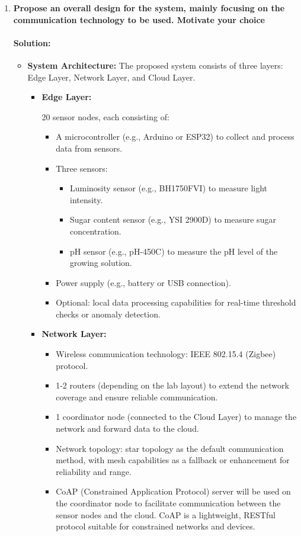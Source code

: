 \documentclass{article}
\begin{document}
\begin{enumerate}
    \item \textbf{Propose an overall design for the system, mainly focusing on the communication technology to be used. Motivate your choice}

    \paragraph{Solution:} 
    
\begin{itemize}
    \item \textbf{System Architecture:} The proposed system consists of three layers: Edge Layer, Network Layer, and Cloud Layer.

\begin{itemize}
    \item \textbf{Edge Layer:} 
    
    20 sensor nodes, each consisting of:
\begin{itemize}
    \item A microcontroller (e.g., Arduino or ESP32) to collect and process data from sensors.
    \item Three sensors:
    \begin{itemize}
        \item Luminosity sensor (e.g., BH1750FVI) to measure light intensity.
        \item Sugar content sensor (e.g., YSI 2900D) to measure sugar concentration.
        \item pH sensor (e.g., pH-450C) to measure the pH level of the growing solution.
    \end{itemize}
    \item Power supply (e.g., battery or USB connection).
    \item Optional: local data processing capabilities for real-time threshold checks or anomaly detection.
\end{itemize}

    \item \textbf{Network Layer:}

\begin{itemize}
    \item Wireless communication technology: IEEE 802.15.4 (Zigbee) protocol.
    \item 1-2 routers (depending on the lab layout) to extend the network coverage and ensure reliable communication.
    \item 1 coordinator node (connected to the Cloud Layer) to manage the network and forward data to the cloud.
    \item Network topology: star topology as the default communication method, with mesh capabilities as a fallback or enhancement for reliability and range.
    \item CoAP (Constrained Application Protocol) server will be used on the coordinator node to facilitate communication between the sensor nodes and the cloud. CoAP is a lightweight, RESTful protocol suitable for constrained networks and devices.
\end{itemize}



\end{itemize}
\end{itemize}
\end{enumerate}
\end{document}
